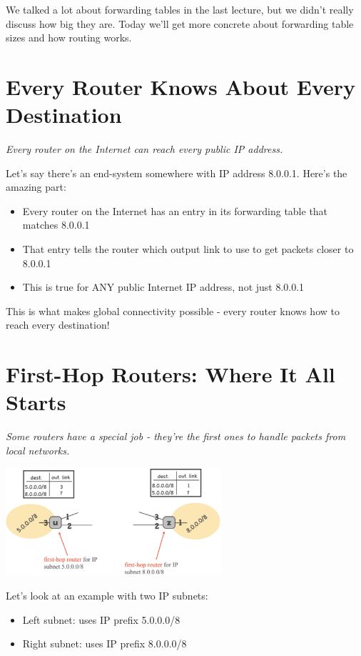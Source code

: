 \documentclass[../../compsys.tex]{subfiles}
\begin{document}
We talked a lot about forwarding tables in the last lecture, but we didn't really discuss how big they are. Today we'll get more concrete about forwarding table sizes and how routing works.

\section{Every Router Knows About Every Destination}
\textit{Every router on the Internet can reach every public IP address.}

Let's say there's an end-system somewhere with IP address 8.0.0.1. Here's the amazing part:

\begin{itemize}
    \item Every router on the Internet has an entry in its forwarding table that matches 8.0.0.1
    \item That entry tells the router which output link to use to get packets closer to 8.0.0.1
    \item This is true for ANY public Internet IP address, not just 8.0.0.1
\end{itemize}

This is what makes global connectivity possible - every router knows how to reach every destination!

\section{First-Hop Routers: Where It All Starts}
\textit{Some routers have a special job - they're the first ones to handle packets from local networks.}

\begin{center}
    \includegraphics[width=0.6\textwidth]{images/hop-router.png}
\end{center}

Let's look at an example with two IP subnets:
\begin{itemize}
    \item Left subnet: uses IP prefix 5.0.0.0/8
    \item Right subnet: uses IP prefix 8.0.0.0/8
\end{itemize}
\end{document}
